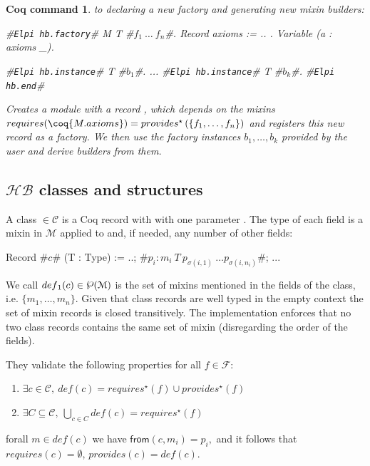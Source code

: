 \documentclass[a4paper,UKenglish,cleveref, autoref]{lipics-v2019}
\newcommand{\HB}{\ensuremath{\mathcal{HB}}}
\newcommand{\mixin}{mixin}
\newcommand{\mixins}{mixins}
\newcommand{\M}{\ensuremath{\mathcal{M}}}
\newcommand{\mixinbuilders}{builders}
\newcommand{\factoryinstances}{factory instances}
\newcommand{\F}{\ensuremath{\mathcal{F}}}
\newcommand{\powerset}[1]{\raisebox{.15\baselineskip}{\Large\ensuremath{\wp}}(#1)}
\newcommand{\C}{\ensuremath{\mathcal{C}}}
\newcommand{\class}{class}
\newcommand{\cdef}{\ensuremath{def}}
\newcommand{\requires}{\ensuremath{requires}}
\newcommand{\provides}{\ensuremath{provides}}
\newcommand{\from}{\ensuremath{\mathsf{from}}}
\newcommand{\set}[1]{\left\{#1\right\}}
\newcommand{\enum}[2]{\ensuremath{\set{#1,\ldots,#2}}}
\newcommand{\hbfactory}{{\tt\color{dkgreen}Elpi hb.factory}}
\newcommand{\hbinstance}{{\tt\color{dkgreen}Elpi hb.instance}}
\newcommand{\hbend}{{\tt\color{dkgreen}Elpi hb.end}}
\theoremstyle{implem}
\theoremstyle{implem}
\theoremstyle{command}
\newtheorem*{command}{Coq command}
\begin{document}
\begin{command} to declaring a new factory and generating new mixin builders:
\begin{coqcode}
#\hbfactory{}# M T #$f_1\ \ldots\ f_n$#.
Record axioms := { .. }.
Variable (a : axioms _).

#\hbinstance{}# T #$b_1$#.
...
#\hbinstance{}# T #$b_k$#.
#\hbend{}#
\end{coqcode}
  Creates a module  with a record , which
  depends on the mixins \(\requires{}(\coq{M.axioms}) = 
  \provides{}^\star\left(\enum{f_1}{f_n}\right)\)
  and registers this new record as a factory. We then use the
  \factoryinstances{} \(b_1, \ldots, b_k\) provided by the user and
  derive \mixinbuilders{} from them.
\end{command}

\subsection{\HB{} classes and structures}
\label{sec:hb-class-struct}


\begin{definition}[\C{}, class]
A \class{}  \(\in \C{}\) is a Coq record with with one parameter
. The type of each field is a \mixin{} in \M{} applied to
 and, if needed, any number of other fields:
\begin{coqcode}
Record #$c$# (T : Type) := { ..; #\(p_i : m_i\ T\ p_{\sigma(i,1)}\ \ldots p_{\sigma(i,n_i)}\)#; ..}.
\end{coqcode}
We call \(\cdef{}_1(c) \in \powerset\M{}\) is the set of \mixins{} mentioned in the fields of the \class{},
i.e. \(\{m_1, \ldots,m_n\}\).
Given that \class{} records are well typed in the empty context
the set of \mixin{} records is closed transitively.
The implementation enforces that no two
\class{} records contains the same set of
\mixin{} (disregarding the order of the fields).

  They validate the following properties for all \(f \in \F{}\):
  \begin{enumerate}
    \item\( \exists c \in \C{},~ \cdef{}(c) = \requires{}^\star(f) \cup \provides{}^\star(f) \)
    \item\( \exists C \subseteq \C{},~\bigcup_{c\in C}\cdef{}(c) = \requires{}^\star(f)\)
    \end{enumerate}
  \end{definition}


\begin{proposition}[\( \C{} \subseteq \F{} \)]
  forall \(m \in \cdef{}(c)\) we have \(\from{}(c,m_i) = p_i,\) and it
  follows that \(\requires{}(c)=\emptyset \),
  \(\provides{}(c)=\cdef{}(c).\)
\end{proposition}
\end{document}
